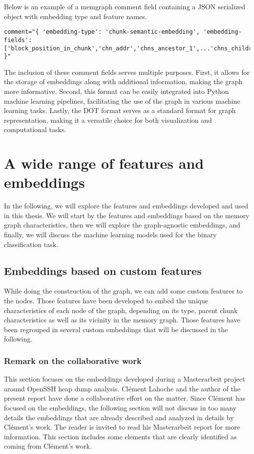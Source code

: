 Below is an example of a \gls{memgraph} comment field containing a JSON serialized object with embedding type and feature names.

\begin{lstlisting}[style=text, caption={A memgraph comment field example containing JSON serialized object with embedding type and feature names. Output is cropped.}]
    comment="{ 'embedding-type': 'chunk-semantic-embedding', 'embedding-fields': ['block_position_in_chunk','chn_addr','chns_ancestor_1',...'chns_children_8','chunk_byte_size','chunk_number_in_heap','chunk_ptrs','chunk_vns','ptrs_ancestor_1','ptrs_ancestor_2',...,'ptrs_children_8','entropy'] }"
\end{lstlisting}

The inclusion of these comment fields serves multiple purposes. First, it allows for the storage of embeddings along with additional information, making the graph more informative. Second, this format can be easily integrated into Python machine learning pipelines, facilitating the use of the graph in various machine learning tasks. Lastly, the DOT format serves as a standard format for graph representation, making it a versatile choice for both visualization and computational tasks.

\section{A wide range of features and embeddings}
In the following, we will explore the features and embeddings developed and used in this thesis. We will start by the features and embeddings based on the memory graph characteristics, then we will explore the graph-agnostic embeddings, and finally, we will discuss the machine learning models used for the binary classification task.

\subsection{Embeddings based on custom features}
While doing the construction of the graph, we can add some custom features to the nodes. Those features have been developed to embed the unique characteristics of each node of the graph, depending on its type, parent chunk characteristics as well as its vicinity in the memory graph. Those features have been regrouped in several custom embeddings that will be discussed in the following.

\subsubsection{Remark on the collaborative work}
This section focuses on the embeddings developed during a Masterarbeit project around OpenSSH heap dump analysis. Clément Lahoche and the author of the present report have done a collaborative effort on the matter. Since Clément has focused on the embeddings, the following section will not discuss in too many details the embeddings that are already described and analyzed in details by Clément's work. The reader is invited to read his Masterarbeit report \cite{ClementEmbeddingsMasterarbeit23} for more information. This section includes some elements that are clearly identified as coming from Clément's work.

